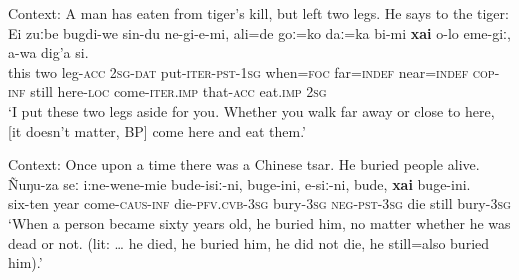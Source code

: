 \begin{exe}
	\ex\label{exAppendixUdiheConcessive6}
	Context: A man has eaten from tiger’s kill, but left two legs. He says to the tiger:\\
	\gll Ei zuːbe bugdi-we sin-du ne-gi-e-mi, ali=de goː=ko daː=ka bi-mi \textbf{xai} o-lo eme-giː, a-wa dig’a si.\\
	this two leg-\textsc{acc} 2\textsc{sg}-\textsc{dat} put-\textsc{iter}-\textsc{pst}-1\textsc{sg} when=\textsc{foc} far=\textsc{indef} near=\textsc{indef} \textsc{cop}-\textsc{inf} still here-\textsc{loc} come-\textsc{iter}.\textsc{imp} that-\textsc{acc} eat.\textsc{imp} 2\textsc{sg}\\
	\glt \lq I put these two legs aside for you. Whether you walk far away or close to here, [it doesn't matter, BP] come here and eat them.\rq{ }\parencite[The tiger for Udihe people]{NikolaevaEtAl2019}	
	
	\ex\label{exAppendixUdiheConcessive7}
	Context: Once upon a time there was a Chinese tsar. He buried people alive.\\
	\gll Ñuŋu-za seː i:ne-wene-mie bude-isiː-ni, buge-ini, e-siː-ni, bude, \textbf{xai} buge-ini.\\
	six-ten year come-\textsc{caus}-\textsc{inf} die-\textsc{pfv}.\textsc{cvb}-3\textsc{sg} bury-3\textsc{sg} \textsc{neg}-\textsc{pst}-3\textsc{sg} die still bury-3\textsc{sg}\\
	\glt \lq When a person became sixty years old, he buried him, no matter whether he was dead or not. (lit: … he died, he buried him, he did not die, he still=also buried him).' \parencite[18–20]{NikolaevaEtAl2003}
\end{exe}
